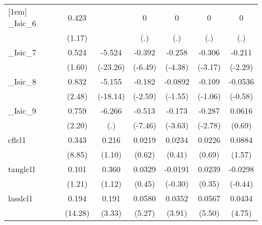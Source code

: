 \begin{table}[htbp]
\begin{tabular}{l*{6}{c}}
[1em]
\_Isic\_6     &       0.423         &                     &           0         &           0         &           0         &           0         \\
            &      (1.17)         &                     &         (.)         &         (.)         &         (.)         &         (.)         \\
[1em]
\_Isic\_7     &       0.524         &      -5.524\sym{***}&      -0.392\sym{***}&      -0.258\sym{***}&      -0.306\sym{**} &      -0.211\sym{*}  \\
            &      (1.60)         &    (-23.26)         &     (-6.49)         &     (-4.38)         &     (-3.17)         &     (-2.29)         \\
[1em]
\_Isic\_8     &       0.832\sym{*}  &      -5.155\sym{***}&      -0.182\sym{*}  &     -0.0892         &      -0.109         &     -0.0536         \\
            &      (2.48)         &    (-18.14)         &     (-2.59)         &     (-1.55)         &     (-1.06)         &     (-0.58)         \\
[1em]
\_Isic\_9     &       0.759\sym{*}  &      -6.266         &      -0.513\sym{***}&      -0.173\sym{***}&      -0.287\sym{**} &      0.0616         \\
            &      (2.20)         &         (.)         &     (-7.46)         &     (-3.63)         &     (-2.78)         &      (0.69)         \\
[1em]
cflcl1      &       0.343\sym{***}&       0.216         &      0.0219         &      0.0234         &      0.0226         &      0.0884         \\
            &      (8.85)         &      (1.10)         &      (0.62)         &      (0.41)         &      (0.69)         &      (1.57)         \\
[1em]
tanglcl1    &       0.101         &       0.360         &      0.0329         &     -0.0191         &      0.0239         &     -0.0298         \\
            &      (1.21)         &      (1.12)         &      (0.45)         &     (-0.30)         &      (0.35)         &     (-0.44)         \\
[1em]
lasslcl1    &       0.194\sym{***}&       0.191\sym{***}&      0.0580\sym{***}&      0.0352\sym{***}&      0.0567\sym{***}&      0.0434\sym{***}\\
            &     (14.28)         &      (3.33)         &      (5.27)         &      (3.91)         &      (5.50)         &      (4.75)         \\

\end{tabular}
\end{table}
